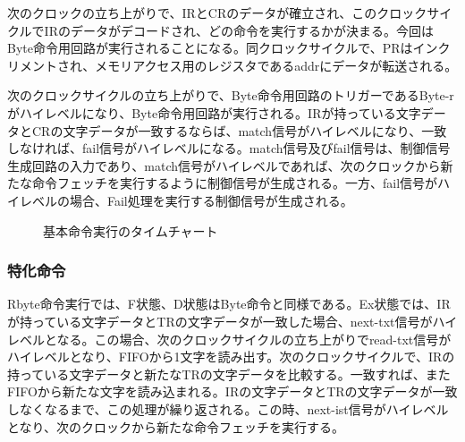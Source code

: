 \documentclass[paper]{ieicej}
\begin{document}
次のクロックの立ち上がりで、IRとCRのデータが確立され、このクロックサイクルでIRのデータがデコードされ、どの命令を実行するかが決まる。今回はByte命令用回路が実行されることになる。同クロックサイクルで、PRはインクリメントされ、メモリアクセス用のレジスタであるaddrにデータが転送される。

次のクロックサイクルの立ち上がりで、Byte命令用回路のトリガーであるByte-rがハイレベルになり、Byte命令用回路が実行される。IRが持っている文字データとCRの文字データが一致するならば、match信号がハイレベルになり、一致しなければ、fail信号がハイレベルになる。match信号及びfail信号は、制御信号生成回路の入力であり、match信号がハイレベルであれば、次のクロックから新たな命令フェッチを実行するように制御信号が生成される。一方、fail信号がハイレベルの場合、Fail処理を実行する制御信号が生成される。

\begin{figure}[h]
       \caption{基本命令実行のタイムチャート }
\end{figure}

\subsubsection{特化命令}

Rbyte命令実行では、F状態、D状態はByte命令と同様である。Ex状態では、IRが持っている文字データとTRの文字データが一致した場合、next-txt信号がハイレベルとなる。この場合、次のクロックサイクルの立ち上がりでread-txt信号がハイレベルとなり、FIFOから1文字を読み出す。次のクロックサイクルで、IRの持っている文字データと新たなTRの文字データを比較する。一致すれば、またFIFOから新たな文字を読み込まれる。IRの文字データとTRの文字データが一致しなくなるまで、この処理が繰り返される。この時、next-ist信号がハイレベルとなり、次のクロックから新たな命令フェッチを実行する。
\end{document}

